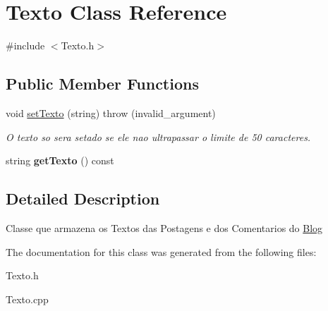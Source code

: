 \hypertarget{classTexto}{}\section{Texto Class Reference}
\label{classTexto}


{\ttfamily \#include $<$Texto.\+h$>$}

\subsection*{Public Member Functions}
\begin{DoxyCompactItemize}
\item 
void \hyperlink{classTexto_a2757e0409bd76bb77c8eb6ecb09cc69d}{set\+Texto} (string)  throw (invalid\+\_\+argument)\hypertarget{classTexto_a2757e0409bd76bb77c8eb6ecb09cc69d}{}\label{classTexto_a2757e0409bd76bb77c8eb6ecb09cc69d}

\begin{DoxyCompactList}\small\item\em O texto so sera setado se ele nao ultrapassar o limite de 50 caracteres. \end{DoxyCompactList}\item 
string {\bfseries get\+Texto} () const \hypertarget{classTexto_ae7fc995a10e413f60563bc8f4de265ec}{}\label{classTexto_ae7fc995a10e413f60563bc8f4de265ec}

\end{DoxyCompactItemize}


\subsection{Detailed Description}
Classe que armazena os Textos das Postagens e dos Comentarios do \hyperlink{classBlog}{Blog} 

The documentation for this class was generated from the following files\+:\begin{DoxyCompactItemize}
\item 
Texto.\+h\item 
Texto.\+cpp\end{DoxyCompactItemize}
